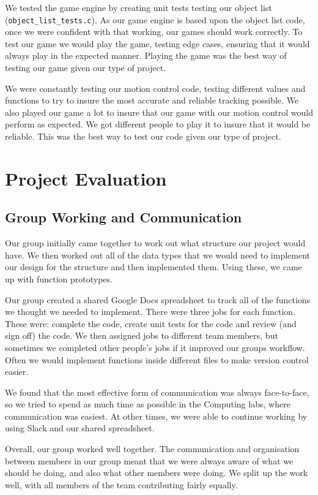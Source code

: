 \documentclass[10pt]{article}
\begin{document}
We tested the game engine by creating unit tests testing our object list (\texttt{object\_list\_tests.c}). As our game engine is based upon the object list code, once we were confident with that working, our games should work correctly. To test our game we would play the game, testing edge cases, ensuring that it would always play in the expected manner. Playing the game was the best way of testing our game given our type of project.

We were constantly testing our motion control code, testing different values and functions to try to insure the most accurate and reliable tracking possible. We also played our game a lot to insure that our game with our motion control would perform as expected.  We got different people to play it to insure that it would be reliable. This was the best way to test our code given our type of project.

\section{Project Evaluation}

\subsection{Group Working and Communication}

Our group initially came together to work out what structure our project would have. We then worked out all of the data types that we would need to implement our design for the structure and then implemented them. Using these, we came up with function prototypes.

Our group created a shared Google Docs spreadsheet to track all of the functions we thought we needed to implement. There were three jobs for each function. These were: complete the code, create unit tests for the code and review (and sign off) the code. We then assigned jobs to different team members, but sometimes we completed other people's jobs if it improved our groups workflow. Often we would implement functions inside different files to make version control easier.

We found that the most effective form of communication was always face-to-face, so we tried to spend as much time as possible in the Computing labs, where communication was easiest. At other times, we were able to continue working by using Slack and our shared spreadsheet.

Overall, our group worked well together. The communication and organisation between members in our group meant that we were always aware of what we should be doing, and also what other members were doing. We split up the work well, with all members of the team contributing fairly equally.
\end{document}
